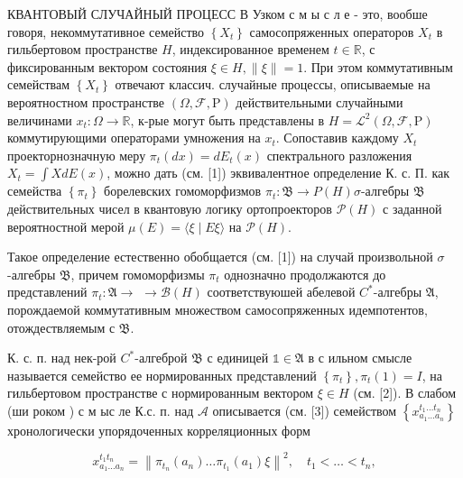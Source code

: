 \documentclass[10pt]{article}
\begin{document}
КВАНТОВЫЙ СЛУЧАЙНЫЙ ПРОЦЕСС В Узком с м ы с л е - это, вообше говоря, некоммутативное семейство $\left\{X_{t}\right\}$ самосопряженных операторов $X_{t}$ в гильбертовом пространстве $H$, индексированное временем $t \in \mathbb{R}$, с фиксированным вектором состояния $\xi \in H,\|\xi\|=1$. При этом коммутативным семействам $\left\{X_{t}\right\}$ отвечают классич. случайные процессы, описываемые на вероятностном пространстве $(\Omega, \mathscr{F}, \mathrm{P})$ действительными случайными величинами $x_{t}: \Omega \rightarrow \mathbb{R}$, к-рые могут быть представлены в $H=\mathscr{L}^{2}(\Omega, \mathscr{F}, \mathrm{P})$ коммутирующими операторами умножения на $x_{t}$. Сопоставив каждому $X_{t}$ проекторнозначную меру $\pi_{t}(d x)=d E_{t}(x)$ спектрального разложения $X_{t}=\int X d E(x)$, можно дать (см. [1]) эквивалентное определение К. с. П. как семейства $\left\{\pi_{t}\right\}$ борелевских гомоморфизмов $\pi_{t}: \mathfrak{B} \rightarrow P(H) \sigma$-алгебры $\mathfrak{B}$ действительных чисел в квантовую логику ортопроекторов $\mathscr{P}(H)$ с заданной вероятностной мерой $\mu(E)=\langle\xi \mid E \xi\rangle$ на $\mathscr{P}(H)$.



Такое определение естественно обобщается (см. [1]) на случай произвольной $\sigma$-алгебры $\mathfrak{B}$, причем гомоморфизмы $\pi_{t}$ однозначно продолжаются до представлений $\pi_{t}: \mathfrak{A} \rightarrow$ $\rightarrow \mathscr{B}(H)$ соответствуюшей абелевой $C^{*}$-алгебры $\mathfrak{A}$, порождаемой коммутативным множеством самосопряженных идемпотентов, отождествляемым с $\mathfrak{B}$.



К. с. п. над нек-рой $C^{*}$-алгеброй $\mathfrak{B}$ с единицей $\mathbb{1} \in \mathfrak{A}$ в с ильном смысле называется семейство ее нормированных представлений $\left\{\pi_{t}\right\}, \pi_{t}(1)=I$, на гильбертовом пространстве с нормированным вектором $\xi \in H$ (см. [2]). В слабом (ши роком ) с м ыс ле К.с. п. над $\mathscr{A}$ описывается (см. [3]) семейством $\left\{x_{a_{1} \ldots a_{n}}^{t_{1} \ldots t_{n}}\right\}$ хронологически упорядоченных корреляционных форм



\[

x_{a_{1} \ldots a_{n}}^{t_{1} t_{n}}=\left\|\pi_{t_{n}}\left(a_{n}\right) \ldots \pi_{t_{1}}\left(a_{1}\right) \xi\right\|^{2}, \quad t_{1}<\ldots<t_{n},

\]
\end{document}
